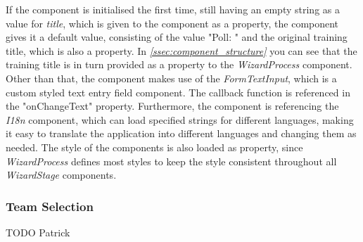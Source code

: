 If the component is initialised the first time, still having an empty string as a value for \textit{title}, which is given to the component as a property, the component gives it a default value, consisting of the value "Poll: " and the original training title, which is also a property. In \textit{\ref{ssec:component_structure} } you can see that the training title is in turn provided as a property to the \textit{WizardProcess} component.
\newline
Other than that, the component makes use of the \textit{FormTextInput}, which is a custom styled text entry field component. The callback function is referenced in the "onChangeText" property. Furthermore, the component is referencing the \textit{I18n} component, which can load specified strings for different languages, making it easy to translate the application into different languages and changing them as needed. The style of the components is also loaded as property, since \textit{WizardProcess} defines most styles to keep the style consistent throughout all \textit{WizardStage} components.

\subsubsection{Team Selection}

\label{sssec:poll_team}

TODO Patrick

